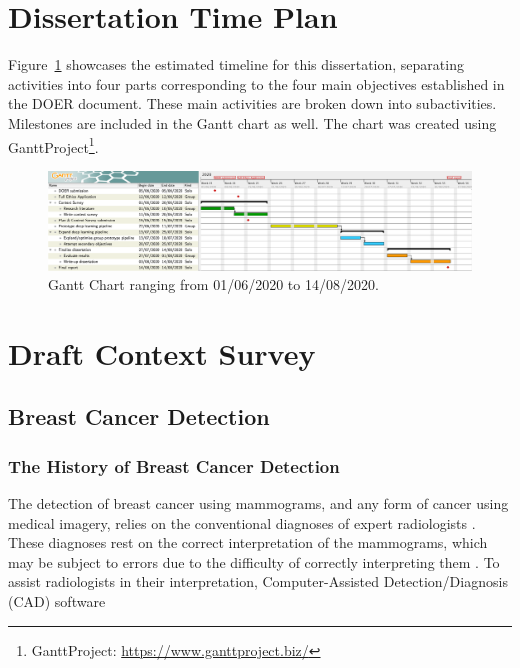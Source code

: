 \documentclass[letterpaper,12pt]{article}
\begin{document}
\section{Dissertation Time Plan}
\label{sec:time-plan}

Figure~\ref{fig:gantt_chart} showcases the estimated timeline for this dissertation, separating activities into four parts corresponding to the four main objectives established in the DOER document. These main activities are broken down into subactivities. Milestones are included in the Gantt chart as well. The chart was created using GanttProject\footnote{GanttProject: \url{https://www.ganttproject.biz/}}.

\begin{figure}[h]
\centerline{\includegraphics[width=\textwidth]{Plan & Draft Context Survey/figures/gantt_chart.png}}
\caption{\label{fig:gantt_chart}Gantt Chart ranging from 01/06/2020 to 14/08/2020.}
\end{figure}



\section{Draft Context Survey}
\label{sec:draft-context-survey}

\subsection{Breast Cancer Detection}

\subsubsection{The History of Breast Cancer Detection}

The detection of breast cancer using mammograms, and any form of cancer using medical imagery, relies on the conventional diagnoses of expert radiologists \cite{Osareh2010}. These diagnoses rest on the correct interpretation of the mammograms, which may be subject to errors due to the difficulty of correctly interpreting them \cite{Elter2009}. To assist radiologists in their interpretation, Computer-Assisted Detection/Diagnosis (CAD) software 
\end{document}
